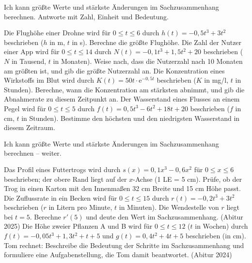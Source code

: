 \begin{aufgabe}{Ich kann größte Werte und stärkste Änderungen im Sachzusammenhang berechnen. Antworte mit Zahl, Einheit und Bedeutung.}
\begin{teile}
\teil Die Flughöhe einer Drohne wird für $0 \le t \le 6$ durch $h(t) = -0{,}5t^3 + 3t^2$ beschrieben ($h$ in m, $t$ in s). Berechne die größte Flughöhe.
\teil Die Zahl der Nutzer einer App wird für $0 \le t \le 14$ durch $N(t) = -0{,}1t^3 + 1{,}5t^2 + 20$ beschrieben ($N$ in Tausend, $t$ in Monaten). Weise nach, dass die Nutzerzahl nach 10 Monaten am größten ist, und gib die größte Nutzerzahl an.
\teil Die Konzentration eines Wirkstoffs im Blut wird durch $K(t) = 50t\cdot\mathrm{e}^{-0{,}5t}$ beschrieben ($K$ in mg/l, $t$ in Stunden). Berechne, wann die Konzentration am stärksten abnimmt, und gib die Abnahmerate zu diesem Zeitpunkt an.
\teil Der Wasserstand eines Flusses an einem Pegel wird für $0 \le t \le 5$ durch $f(t) = 0{,}5t^3 - 6t^2 + 18t + 20$ beschrieben ($f$ in cm, $t$ in Stunden). Bestimme den höchsten und den niedrigsten Wasserstand in diesem Zeitraum.
\end{teile}
\end{aufgabe}

\begin{aufgabe}{Ich kann größte Werte und stärkste Änderungen im Sachzusammenhang berechnen – weiter.}
\begin{teile}
\teil Das Profil eines Futtertrogs wird durch $s(x) = 0{,}1x^3 - 0{,}6x^2$ für $0 \le x \le 6$ beschrieben; der obere Rand liegt auf der $x$-Achse (1 LE = 5 cm). Prüfe, ob der Trog in einen Karton mit den Innenmaßen 32 cm Breite und 15 cm Höhe passt.
\teil Die Zuflussrate in ein Becken wird für $0 \le t \le 15$ durch $r(t) = -0{,}2t^3 + 3t^2$ beschrieben ($r$ in Litern pro Minute, $t$ in Minuten). Die Wendestelle von $r$ liegt bei $t = 5$. Berechne $r'(5)$ und deute den Wert im Sachzusammenhang. (Abitur 2025)
\teil Die Höhe zweier Pflanzen A und B wird für $0 \le t \le 12$ ($t$ in Wochen) durch $f(t) = -0{,}05t^3 + 1{,}3t^2 + t + 5$ und $g(t) = 0{,}4t^2 + 4t + 5$ beschrieben (in cm). Tom rechnet:
Beschreibe die Bedeutung der Schritte im Sachzusammenhang und formuliere eine Aufgabenstellung, die Tom damit beantwortet. (Abitur 2024)
\end{teile}
\end{aufgabe}

